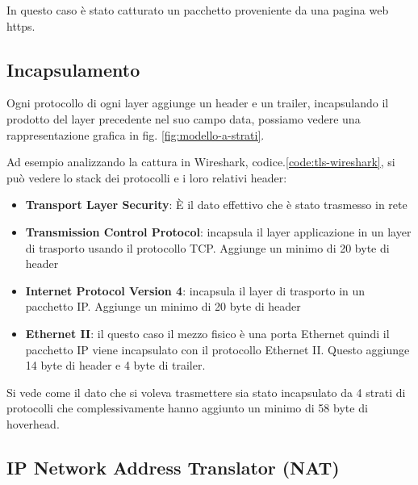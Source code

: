 In questo caso è stato catturato un pacchetto proveniente da una pagina web https.

\subsection{Incapsulamento}

Ogni protocollo di ogni layer aggiunge un header e un trailer, incapsulando il prodotto del layer precedente nel suo campo data, possiamo vedere una rappresentazione grafica in fig. \ref{fig:modello-a-strati}.


Ad esempio analizzando la cattura in Wireshark, codice.\ref{code:tls-wireshark}, si può vedere lo stack dei protocolli e i loro relativi header:

\begin{itemize}
    \item \textbf{Transport Layer Security}\cite{RFC_8446}: È il dato effettivo che è stato trasmesso in rete

    \item \textbf{Transmission Control Protocol}\cite{RFC_0793}: incapsula il layer applicazione in un layer di trasporto usando il protocollo TCP. Aggiunge un minimo di 20 byte di header

    \item \textbf{Internet Protocol Version 4}\cite{RFC_0791}: incapsula il layer di trasporto in un pacchetto IP. Aggiunge un minimo di 20 byte di header

    \item \textbf{Ethernet II}\cite{ethernet-ii}: il questo caso il mezzo fisico è una porta Ethernet quindi il pacchetto IP viene incapsulato con il protocollo Ethernet II. Questo aggiunge 14 byte di header e 4 byte di trailer.
\end{itemize}

Si vede come il dato che si voleva trasmettere sia stato incapsulato da 4 strati di protocolli che complessivamente hanno aggiunto un minimo di 58 byte di hoverhead.

\subsection{IP Network Address Translator (NAT)}

